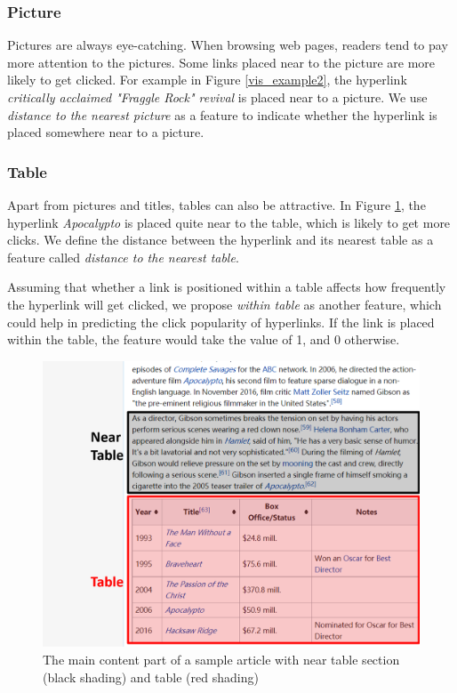 \subsubsection{Picture}

Pictures are always eye-catching. When browsing web pages, readers tend to pay more attention to the pictures. Some links placed near to the picture are more likely to get clicked. For example in Figure \ref{vis_example2}, the hyperlink \emph{critically acclaimed "Fraggle Rock" revival} is placed near to a picture. We use \emph{distance to the nearest picture} as a feature to indicate whether the hyperlink is placed somewhere near to a picture.
    
\subsubsection{Table}

Apart from pictures and titles, tables can also be attractive. In Figure \ref{vis_example3}, the hyperlink \emph{Apocalypto} is placed quite near to the table, which is likely to get more clicks. We define the distance between the hyperlink and its nearest table as a feature called \emph{distance to the nearest table}.

Assuming that whether a link is positioned within a table affects how frequently the hyperlink will get clicked, we propose \emph{within table} as another feature, which could help in predicting the click popularity of hyperlinks. If the link is placed within the table, the feature would take the value of 1, and 0 otherwise.

\begin{figure}[t]
\centering
\includegraphics[width=1\columnwidth]{vis_example3}
\caption{The main content part of a sample article with near table section (black shading) and table (red shading)}
\label{vis_example3}
\end{figure}